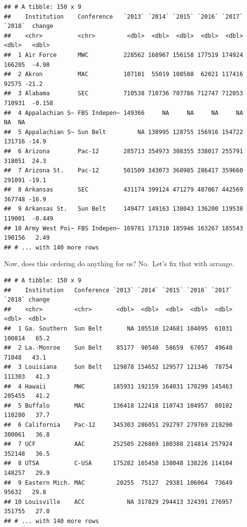 \documentclass[]{book}
\newenvironment{Shaded}{\begin{snugshade}}{\end{snugshade}}
\newcommand{\DataTypeTok}[1]{\textcolor[rgb]{0.13,0.29,0.53}{#1}}
\newcommand{\DecValTok}[1]{\textcolor[rgb]{0.00,0.00,0.81}{#1}}
\newcommand{\KeywordTok}[1]{\textcolor[rgb]{0.13,0.29,0.53}{\textbf{#1}}}
\newcommand{\NormalTok}[1]{#1}
\newcommand{\OperatorTok}[1]{\textcolor[rgb]{0.81,0.36,0.00}{\textbf{#1}}}
\newcommand{\StringTok}[1]{\textcolor[rgb]{0.31,0.60,0.02}{#1}}
\begin{document}
\begin{verbatim}
## # A tibble: 150 x 9
##    Institution    Conference   `2013` `2014` `2015` `2016` `2017` `2018`  change
##    <chr>          <chr>         <dbl>  <dbl>  <dbl>  <dbl>  <dbl>  <dbl>   <dbl>
##  1 Air Force      MWC          228562 168967 156158 177519 174924 166205  -4.98 
##  2 Akron          MAC          107101  55019 108588  62021 117416  92575 -21.2  
##  3 Alabama        SEC          710538 710736 707786 712747 712053 710931  -0.158
##  4 Appalachian S~ FBS Indepen~ 149366     NA     NA     NA     NA     NA  NA    
##  5 Appalachian S~ Sun Belt         NA 138995 128755 156916 154722 131716 -14.9  
##  6 Arizona        Pac-12       285713 354973 308355 338017 255791 318051  24.3  
##  7 Arizona St.    Pac-12       501509 343073 368985 286417 359660 291091 -19.1  
##  8 Arkansas       SEC          431174 399124 471279 487067 442569 367748 -16.9  
##  9 Arkansas St.   Sun Belt     149477 149163 138043 136200 119538 119001  -0.449
## 10 Army West Poi~ FBS Indepen~ 169781 171310 185946 163267 185543 190156   2.49 
## # ... with 140 more rows
\end{verbatim}

Now, does this ordering do anything for us? No.~Let's fix that with arrange.

\begin{Shaded}
\end{Shaded}

\begin{verbatim}
## # A tibble: 150 x 9
##    Institution   Conference `2013` `2014` `2015` `2016` `2017` `2018` change
##    <chr>         <chr>       <dbl>  <dbl>  <dbl>  <dbl>  <dbl>  <dbl>  <dbl>
##  1 Ga. Southern  Sun Belt       NA 105510 124681 104095  61031 100814   65.2
##  2 La.-Monroe    Sun Belt    85177  90540  58659  67057  49640  71048   43.1
##  3 Louisiana     Sun Belt   129878 154652 129577 121346  78754 111303   41.3
##  4 Hawaii        MWC        185931 192159 164031 170299 145463 205455   41.2
##  5 Buffalo       MAC        136418 122418 110743 104957  80102 110280   37.7
##  6 California    Pac-12     345303 286051 292797 279769 219290 300061   36.8
##  7 UCF           AAC        252505 226869 180388 214814 257924 352148   36.5
##  8 UTSA          C-USA      175282 165458 138048 138226 114104 148257   29.9
##  9 Eastern Mich. MAC         20255  75127  29381 106064  73649  95632   29.8
## 10 Louisville    ACC            NA 317829 294413 324391 276957 351755   27.0
## # ... with 140 more rows
\end{verbatim}
\end{document}
